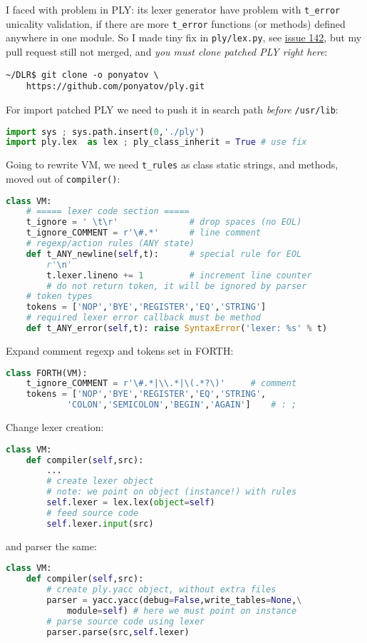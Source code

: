 I faced with problem in PLY: its lexer generator have problem with
\verb|t_error| unicality validation, if there are more \verb|t_error| functions
(or methods) defined anywhere in one module. So I made tiny fix in
\verb|ply/lex.py|, see
\href{http://github.com/dabeaz/ply/issues/142}{issue 142}, but my pull request
still not merged, and \emph{you must clone patched PLY right here}:
\begin{lstlisting}
~/DLR$ git clone -o ponyatov \
	https://github.com/ponyatov/ply.git
\end{lstlisting}
For import patched PLY we need to push it in search path \emph{before}
\verb|/usr/lib|:
\begin{lstlisting}[language=Python]
import sys ; sys.path.insert(0,'./ply')
import ply.lex  as lex ; ply_class_inherit = True # use fix
\end{lstlisting}

\bigskip
Going to rewrite VM, we need \verb|t_rules| as class static strings, and
methods, moved out of \verb|compiler()|:
\begin{lstlisting}[language=Python]
class VM:
	# ===== lexer code section =====
	t_ignore = ' \t\r'				# drop spaces (no EOL)
	t_ignore_COMMENT = r'\#.*'		# line comment
	# regexp/action rules (ANY state)
	def t_ANY_newline(self,t):		# special rule for EOL
		r'\n'
		t.lexer.lineno += 1			# increment line counter
		# do not return token, it will be ignored by parser
	# token types
	tokens = ['NOP','BYE','REGISTER','EQ','STRING']
	# required lexer error callback must be method
	def t_ANY_error(self,t): raise SyntaxError('lexer: %s' % t)
\end{lstlisting}
Expand comment regexp and tokens set in FORTH:
\begin{lstlisting}[language=Python]
class FORTH(VM):
	t_ignore_COMMENT = r'\#.*|\\.*|\(.*?\)'		# comment
	tokens = ['NOP','BYE','REGISTER','EQ','STRING',
			'COLON','SEMICOLON','BEGIN','AGAIN']	# : ;
\end{lstlisting}
Change lexer creation:
\begin{lstlisting}[language=Python]
class VM:
	def compiler(self,src):
		...
		# create lexer object
		# note: we point on object (instance!) with rules 
		self.lexer = lex.lex(object=self)
		# feed source code
		self.lexer.input(src)
\end{lstlisting}
and parser the same:
\begin{lstlisting}[language=Python]
class VM:
	def compiler(self,src):
		# create ply.yacc object, without extra files
		parser = yacc.yacc(debug=False,write_tables=None,\
			module=self) # here we must point on instance
		# parse source code using lexer
		parser.parse(src,self.lexer)
\end{lstlisting}

